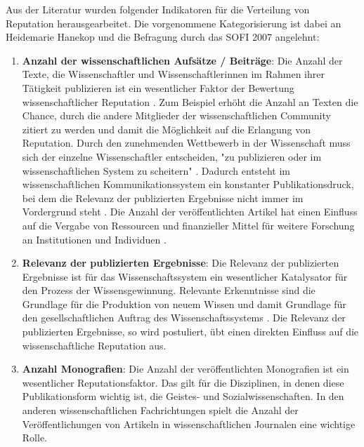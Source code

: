 Aus der Literatur wurden folgender Indikatoren für die Verteilung von Reputation herausgearbeitet. Die vorgenommene Kategorisierung ist dabei an Heidemarie Hanekop \cite{Hanekop_2008} und die Befragung durch das SOFI 2007 \cite{SOFI_2007} angelehnt:
\begin{enumerate}
\item \textbf{Anzahl der wissenschaftlichen Aufsätze / Beiträge}: Die Anzahl der Texte, die Wissenschaftler und Wissenschaftlerinnen im Rahmen ihrer Tätigkeit publizieren ist ein wesentlicher Faktor der Bewertung wissenschaftlicher Reputation \cite{Warnke_2012} \cite{Clapham_2005} \cite{Luhmann_1970}. Zum Beispiel erhöht die Anzahl an Texten die Chance, durch die andere Mitglieder der wissenschaftlichen Community zitiert zu werden und damit die Möglichkeit auf die Erlangung von Reputation. Durch den zunehmenden Wettbewerb in der Wissenschaft muss sich der einzelne Wissenschaftler entscheiden, "zu publizieren oder im wissenschaftlichen System zu scheitern" \cite{Suess_2006}. Dadurch entsteht im wissenschaftlichen Kommunikationssystem ein konstanter Publikationsdruck, bei dem die Relevanz der publizierten Ergebnisse nicht immer im Vordergrund steht \cite{Hamilton_1990}. Die Anzahl der veröffentlichten Artikel hat einen Einfluss auf die Vergabe von Ressourcen und finanzieller Mittel für weitere Forschung an Institutionen und Individuen \cite{Warnke_2012} \cite{Hamilton_1990}.
\item \textbf{Relevanz der publizierten Ergebnisse}: Die Relevanz der publizierten Ergebnisse ist für das Wissenschaftssystem ein wesentlicher Katalysator für den Prozess der Wissensgewinnung. Relevante Erkenntnisse sind die Grundlage für die Produktion von neuem Wissen und damit Grundlage für den gesellschaftlichen Auftrag des Wissenschaftssystems \cite{hanekop_2008}. Die Relevanz der publizierten Ergebnisse, so wird postuliert, übt einen direkten Einfluss auf die wissenschaftliche Reputation aus.
\item \textbf{Anzahl Monografien}: Die Anzahl der veröffentlichten Monografien ist ein wesentlicher Reputationsfaktor. Das gilt für die Disziplinen, in denen diese Publikationsform wichtig ist, die Geistes- und Sozialwissenschaften. In den anderen wissenschaftlichen Fachrichtungen spielt die Anzahl der Veröffentlichungen von Artikeln in wissenschaftlichen Journalen eine wichtige Rolle.

\end{enumerate}
